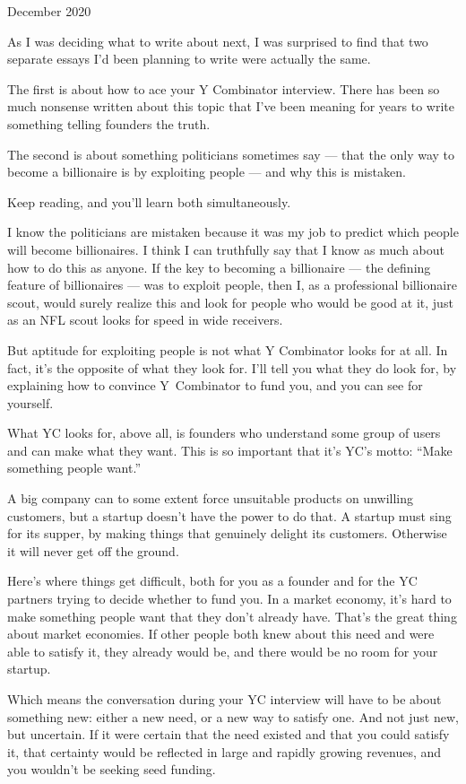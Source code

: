 December 2020

As I was deciding what to write about next, I was surprised to find that
two separate essays I'd been planning to write were actually the same.

The first is about how to ace your Y Combinator interview. There has
been so much nonsense written about this topic that I've been meaning
for years to write something telling founders the truth.

The second is about something politicians sometimes say --- that the
only way to become a billionaire is by exploiting people --- and why
this is mistaken.

Keep reading, and you'll learn both simultaneously.

I know the politicians are mistaken because it was my job to predict
which people will become billionaires. I think I can truthfully say that
I know as much about how to do this as anyone. If the key to becoming a
billionaire --- the defining feature of billionaires --- was to exploit
people, then I, as a professional billionaire scout, would surely
realize this and look for people who would be good at it, just as an NFL
scout looks for speed in wide receivers.

But aptitude for exploiting people is not what Y Combinator looks for at
all. In fact, it's the opposite of what they look for. I'll tell you
what they do look for, by explaining how to convince Y~Combinator to
fund you, and you can see for yourself.

What YC looks for, above all, is founders who understand some group of
users and can make what they want. This is so important that it's YC's
motto: ``Make something people want.''

A big company can to some extent force unsuitable products on unwilling
customers, but a startup doesn't have the power to do that. A startup
must sing for its supper, by making things that genuinely delight its
customers. Otherwise it will never get off the ground.

Here's where things get difficult, both for you as a founder and for the
YC partners trying to decide whether to fund you. In a market economy,
it's hard to make something people want that they don't already have.
That's the great thing about market economies. If other people both knew
about this need and were able to satisfy it, they already would be, and
there would be no room for your startup.

Which means the conversation during your YC interview will have to be
about something new: either a new need, or a new way to satisfy one. And
not just new, but uncertain. If it were certain that the need existed
and that you could satisfy it, that certainty would be reflected in
large and rapidly growing revenues, and you wouldn't be seeking seed
funding.

